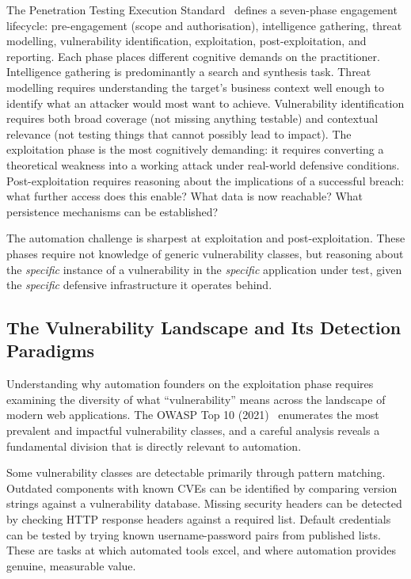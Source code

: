 \documentclass[12pt,a4paper,oneside,openany]{book}
\begin{document}
The Penetration Testing Execution Standard~\citep{ptes2012} defines a seven-phase engagement lifecycle: pre-engagement (scope and authorisation), intelligence gathering, threat modelling, vulnerability identification, exploitation, post-exploitation, and reporting. Each phase places different cognitive demands on the practitioner. Intelligence gathering is predominantly a search and synthesis task. Threat modelling requires understanding the target's business context well enough to identify what an attacker would most want to achieve. Vulnerability identification requires both broad coverage (not missing anything testable) and contextual relevance (not testing things that cannot possibly lead to impact). The exploitation phase is the most cognitively demanding: it requires converting a theoretical weakness into a working attack under real-world defensive conditions. Post-exploitation requires reasoning about the implications of a successful breach: what further access does this enable? What data is now reachable? What persistence mechanisms can be established?

The automation challenge is sharpest at exploitation and post-exploitation. These phases require not knowledge of generic vulnerability classes, but reasoning about the \textit{specific} instance of a vulnerability in the \textit{specific} application under test, given the \textit{specific} defensive infrastructure it operates behind.

\subsection{The Vulnerability Landscape and Its Detection Paradigms}

Understanding why automation founders on the exploitation phase requires examining the diversity of what ``vulnerability'' means across the landscape of modern web applications. The OWASP Top 10 (2021)~\citep{owasptop10} enumerates the most prevalent and impactful vulnerability classes, and a careful analysis reveals a fundamental division that is directly relevant to automation.

Some vulnerability classes are detectable primarily through pattern matching. Outdated components with known CVEs can be identified by comparing version strings against a vulnerability database. Missing security headers can be detected by checking HTTP response headers against a required list. Default credentials can be tested by trying known username-password pairs from published lists. These are tasks at which automated tools excel, and where automation provides genuine, measurable value.
\end{document}
